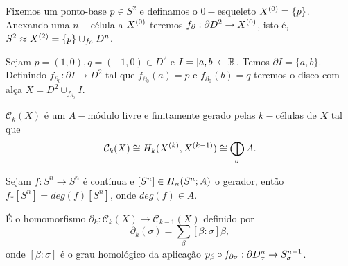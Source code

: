 \documentclass{beamer}
\begin{document}
	
	\begin{frame}
		\begin{exemplo}[n-esfera]
			Fixemos um ponto-base $p \in S^{2}$ e definamos o $0-$esqueleto $X^{(0)}=\{p\}$. Anexando uma $n-$célula a $X^{(0)}$ teremos $f_{\partial}: \partial D^{2} \to X^{(0)}$, isto é, $S^{2} \approx X^{(2)} = \{p\}\cup_{f_{\partial}} D^{n}_{}$.
		\end{exemplo}
		
		\pause
		\begin{exemplo}
			Sejam $p=(1,0), q=(-1,0) \in D^{2}$ e $I=[a,b] \subset \mathbb{R}^{}$. Temos $\partial I=\{a,b\}$. Definindo $f_{\partial_{0}}: \partial I \to D^{2}$ tal que $f_{\partial_{0}}(a)=p$ e $f_{\partial_{0}}(b)=q$ teremos o disco com alça $X=D^{2}\cup_{f_{\partial_{0}}}I$.   
		\end{exemplo}
	\end{frame}
	
	\begin{frame}
		
		\begin{lema}
			$\mathcal{C}_{k}(X)$ é um $A-$módulo livre e finitamente gerado pelas $k-$células de $X$ tal que 
			$$
			\mathcal{C}_{k}(X) \cong 
			H_{k}(X^{(k)}, X^{(k-1)}) \cong \bigoplus \limits_{\sigma} A.
			$$
		\end{lema}
		
		\begin{definicao}
			Sejam $f: S^{n} \to S^{n}$ é contínua e $[S^{n}] \in H_{n}(S^{n};A)$ o gerador, então $f_{*}[S^{n}] = deg(f)[S^{n}]$, onde $deg(f) \in A$.
		\end{definicao}
		
		\pause
		\begin{teorema}[CW-bordo]
			É o homomorfismo $\partial_{k}:\mathcal{C}_{k}(X)\to \mathcal{C}_{k-1}(X)$ definido por
			$$
			\partial_{k}(\sigma) = \sum_{\beta}[\beta:\sigma]\beta,
			$$
			onde $[\beta:\sigma]$ é o grau homológico da aplicação $p_{\beta} \circ f_{\partial\sigma}:\partial D^{n}_{\sigma} \to S^{n-1}_{\sigma}$.
		\end{teorema}
		
	\end{frame}
\end{document}
